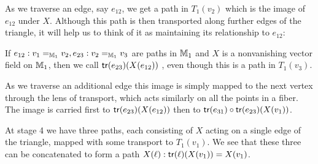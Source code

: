 As we traverse an edge, say \( e_{12} \), we get a path in \( T_1(v_2) \) which is the image of \( e_{12} \) under \( X \). Although this path is then transported along further edges of the triangle, it will help us to think of it as maintaining its relationship to \( e_{12} \):

\begin{mydef}
If \( e_{12}:v_1=_{\mathbb{M}_1} v_2, e_{23}:v_2=_{\mathbb{M}_1}v_3 \) are paths in \( \mathbb{M}_1 \) and \( X \) is a nonvanishing vector field on \( \mathbb{M}_1 \), then we call \( \mathsf{tr}(e_{23})(X(e_{12})) \) , even though this is a path in \( T_1(v_3) \).
\end{mydef}

As we traverse an additional edge this image is simply mapped to the next vertex through the lens of transport, which acts similarly on all the points in a fiber. The image is carried first to \( \mathsf{tr}(e_{23})(X(e_{12})) \) then to \( \mathsf{tr}(e_{31})\circ\mathsf{tr}(e_{23})(X(v_1)) \).

At stage 4 we have three paths, each consisting of \( X \) acting on a single edge of the triangle, mapped with some transport to \( T_1(v_1) \). We see that these three can be concatenated to form a path \( X(\ell):\mathsf{tr}(\ell)(X(v_1))=X(v_1) \).

